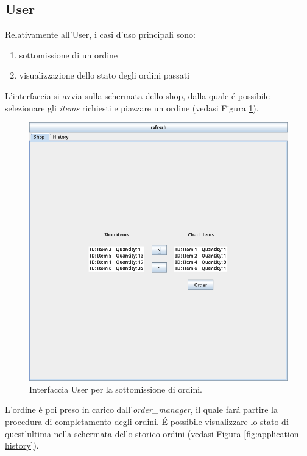 \subsection{User}
Relativamente all'User, i casi d'uso principali sono:
\begin{enumerate}
    \item sottomissione di un ordine
    \item visualizzazione dello stato degli ordini passati
\end{enumerate}
L'interfaccia si avvia sulla schermata dello shop, dalla quale \'e possibile selezionare gli \textit{items} richiesti e piazzare un ordine (vedasi Figura \ref{fig:application-shop}).
\begin{figure}[!ht]\centering
    \includegraphics[width=.75\textwidth]{section/usage_examples/figure/application-shop.png}
    \caption{Interfaccia User per la sottomissione di ordini.}
    \label{fig:application-shop}
\end{figure}
L'ordine \'e poi preso in carico dall'\textit{order\_manager}, il quale far\'a partire la procedura di completamento degli ordini. \'E possibile visualizzare lo stato di quest'ultima nella schermata dello storico ordini (vedasi Figura \ref{fig:application-history}).
